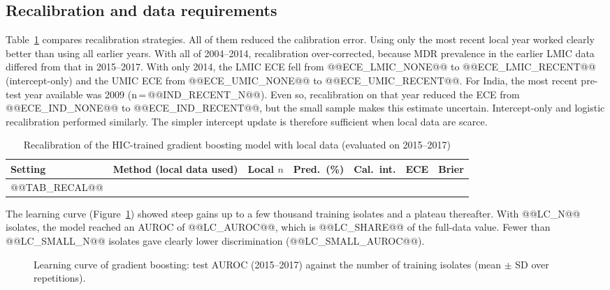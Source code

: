 \documentclass[11pt,a4paper]{article}
\begin{document}
\subsection{Recalibration and data requirements}
Table~\ref{tab:recal} compares recalibration strategies. All of them reduced the calibration error. Using only the most recent local year worked clearly better than using all earlier years. With all of 2004--2014, recalibration over-corrected, because MDR prevalence in the earlier LMIC data differed from that in 2015--2017. With only 2014, the LMIC ECE fell from @@ECE_LMIC_NONE@@ to @@ECE_LMIC_RECENT@@ (intercept-only) and the UMIC ECE from @@ECE_UMIC_NONE@@ to @@ECE_UMIC_RECENT@@. For India, the most recent pre-test year available was 2009 (n\,=\,@@IND_RECENT_N@@). Even so, recalibration on that year reduced the ECE from @@ECE_IND_NONE@@ to @@ECE_IND_RECENT@@, but the small sample makes this estimate uncertain. Intercept-only and logistic recalibration performed similarly. The simpler intercept update is therefore sufficient when local data are scarce.

\begin{table}[t]
\caption{Recalibration of the HIC-trained gradient boosting model with local data (evaluated on 2015--2017)}\label{tab:recal}
\centering\footnotesize
\begin{tabular}{llrcccc}
\toprule
Setting & Method (local data used) & Local $n$ & Pred.\ (\%) & Cal.\ int. & ECE & Brier \\
\midrule
@@TAB_RECAL@@
\bottomrule
\end{tabular}
\end{table}

The learning curve (Figure~\ref{fig:lc}) showed steep gains up to a few thousand training isolates and a plateau thereafter. With @@LC_N@@ isolates, the model reached an AUROC of @@LC_AUROC@@, which is @@LC_SHARE@@ of the full-data value. Fewer than @@LC_SMALL_N@@ isolates gave clearly lower discrimination (@@LC_SMALL_AUROC@@).

\begin{figure}[t]
\centering
{}
\caption{Learning curve of gradient boosting: test AUROC (2015--2017) against the number of training isolates (mean $\pm$ SD over repetitions).}
\label{fig:lc}
\end{figure}
\end{document}
